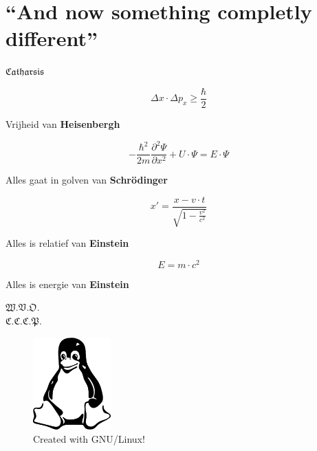 \documentclass[titlepage,a4paper]{article}
\begin{document}
\section*{``And now something completly different''}
\begin{centering}
$\mathfrak{Catharsis}$
\end{centering}
\[
\Delta x\cdot\Delta p_x\geq\displaystyle\frac{\hbar}{2}
\]
\begin{flushright}
Vrijheid van \textbf{Heisenbergh}
\end{flushright}
\[
-\displaystyle\frac{\hbar^2}{2m}\displaystyle\frac{\partial^2\Psi}{\partial x^2}+U\cdot\Psi=E\cdot\Psi
\]
\begin{flushright}
Alles gaat in golven van \textbf{Schr\"odinger}
\end{flushright}
\[
x'=\displaystyle\frac{x-v\cdot t}{\sqrt{1-\displaystyle\frac{v^2}{c^2}}}
\]
\begin{flushright}
Alles is relatief van \textbf{Einstein}
\end{flushright}
\[
E=m\cdot c^2
\]
\begin{flushright}
Alles is energie van \textbf{Einstein}
\end{flushright}
$\mathfrak{W.V.O.}$\\
$\mathfrak{C.C.C.P.}$
\begin{figure}[b]
\centering
\includegraphics[width=3cm]{tux.pdf}
\caption{Created with GNU/Linux!}
\end{figure}
\end{document}
